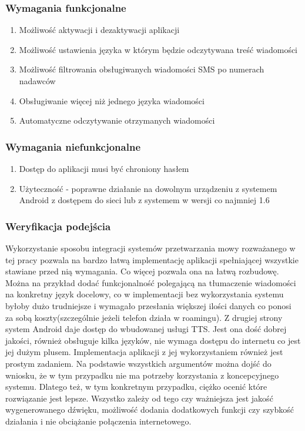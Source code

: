 \subsubsection{Wymagania funkcjonalne}
\begin{enumerate}
	\item Możliwość aktywacji i dezaktywacji aplikacji
	\item Możliwość ustawienia języka w którym będzie odczytywana treść wiadomości
	\item Możliwość filtrowania obsługiwanych wiadomości SMS po numerach nadawców 
	\item Obsługiwanie więcej niż jednego języka wiadomości
	\item Automatyczne odczytywanie otrzymanych wiadomości
\end{enumerate}
\subsubsection{Wymagania niefunkcjonalne}
\begin{enumerate}
	\item Dostęp do aplikacji musi być chroniony hasłem
	\item Użyteczność - poprawne działanie na dowolnym urządzeniu z systemem Android z dostępem do sieci lub z systemem w wersji co najmniej 1.6
\end{enumerate}

\subsubsection{Weryfikacja podejścia}
Wykorzystanie sposobu integracji systemów przetwarzania mowy rozważanego w tej pracy pozwala na bardzo łatwą implementację aplikacji spełniającej wszystkie stawiane przed nią wymagania. Co więcej pozwala ona na łatwą rozbudowę. Można na przykład dodać funkcjonalność polegającą na tłumaczenie wiadomości na konkretny język docelowy, co w implementacji bez wykorzystania systemu byłoby dużo trudniejsze i wymagało przesłania większej ilości danych co ponosi za sobą koszty(szczególnie jeżeli telefon działa w roamingu). Z drugiej strony system Android daje dostęp do wbudowanej usługi TTS. Jest ona dość dobrej jakości, również obsługuje kilka języków, nie wymaga dostępu do internetu co jest jej dużym plusem. Implementacja aplikacji z jej wykorzystaniem również jest prostym zadaniem. Na podstawie wszystkich argumentów można dojść do wniosku, że w tym przypadku nie ma potrzeby korzystania z koncepcyjnego systemu. Dlatego też, w tym konkretnym przypadku, ciężko ocenić które rozwiązanie jest lepsze. Wszystko zależy od tego czy ważniejsza jest jakość wygenerowanego dźwięku, możliwość dodania dodatkowych funkcji czy szybkość działania i nie obciążanie połączenia internetowego.


